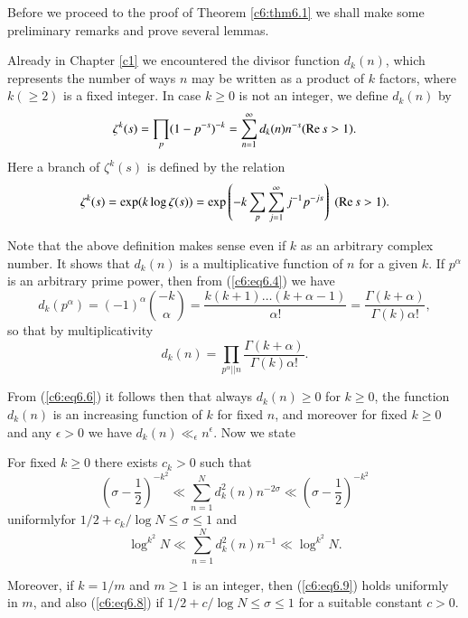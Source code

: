 Before we proceed to the proof of Theorem \ref{c6:thm6.1} we shall
make some preliminary remarks and prove several lemmas. 

Already in Chapter \ref{c1} we encountered the divisor function
$d_k(n)$, which represents the number of ways $n$ may be written as a
product of $k$ factors, where $k(\geq 2)$ is a fixed integer. In case
$k \geq 0$ is not an integer, we define $d_k(n)$ by 
\begin{equation}
\zeta^k (s) = \prod_p (1-p^{-s})^{-k} = \sum\limits^\infty_{n=1} d_k
(n) n^{-s} (\operatorname{Re} s >1). \label{c6:eq6.4} 
\end{equation}
Here a branch of $\zeta^k(s)$ is defined by the relation
\begin{equation}
\zeta^k(s) = \exp (k \log \zeta(s)) = \exp \left(-k \sum\limits_p
\sum\limits^\infty_{j=1} j^{-1} p^{-js} \right) \; (\operatorname{Re} s >
1).\label{c6:eq6.5} 
\end{equation}

Note that the above definition makes sense even if $k$ as an arbitrary
complex number. It shows that $d_k(n)$ is a multiplicative function of
$n$ for a given $k$. If $p^{\alpha}$ is an arbitrary prime power, then
from (\ref{c6:eq6.4}) we have 
\begin{equation}
d_k(p^{\alpha}) = (-1)^{\alpha} \binom{-k}{\alpha} =
\frac{k(k+1)\ldots (k+\alpha-1)}{\alpha !} = \frac{\Gamma
  (k+\alpha)}{\Gamma (k) \alpha !},\label{c6:eq6.6} 
\end{equation}
so that by multiplicativity
\begin{equation}
d_k(n) = \prod_{p^{\alpha}||n} \frac{\Gamma (k+\alpha)}{\Gamma(k)
  \alpha!}. \label{c6:eq6.7} 
\end{equation}

From (\ref{c6:eq6.6}) it follows then that always $d_k(n) \geq 0$ for
$k \geq 0$, the function $d_k(n)$ is an increasing function of $k$ for
fixed $n$, and moreover for fixed $k \geq 0$ and any $\epsilon > 0$ we
have $d_k(n) \ll_\epsilon n^{\epsilon}$. Now we state 

\setcounter{lemma}{0}
\begin{lemma}\label{c6:lem6.1}
For fixed $k \geq 0$ there exists $c_k > 0$ such that 
\begin{equation}
\left(\sigma - \frac{1}{2} \right)^{-k^2} \ll \sum\limits^N_{n=1}
d^2_k(n) n^{-2\sigma} \ll \left( \sigma -\frac{1}{2}\right)^{-k^2}
\label{c6:eq6.8} 
\end{equation}
uniformly\pageoriginale for $1/2 + c_k/\log N \leq \sigma \leq 1$ and 
\begin{equation}
\log^{k^2} N \ll \sum\limits^{N}_{n=1} d^2_k(n) n^{-1} \ll \log^{k^2}
N.\label{c6:eq6.9} 
\end{equation}

Moreover, if $k =1/m$ and $m\geq 1$ is an integer, then
(\ref{c6:eq6.9}) holds uniformly in $m$, and also (\ref{c6:eq6.8}) if
$1/2 + c / \log N \leq \sigma \leq 1$ for a suitable constant $c >0$.  
\end{lemma}

